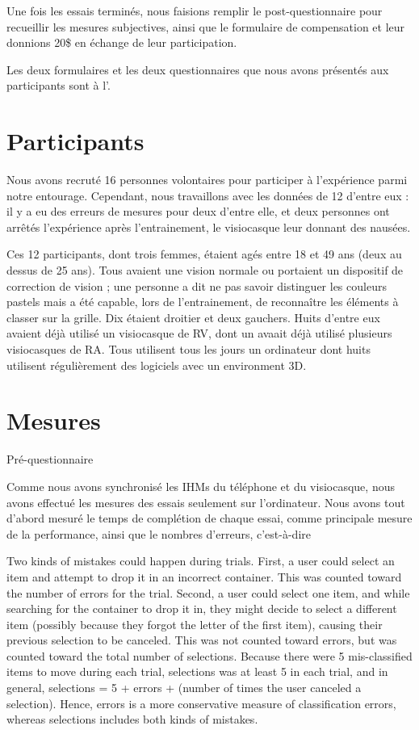 Une fois les essais terminés, nous faisions remplir le post-questionnaire pour recueillir les mesures subjectives, ainsi que le formulaire de compensation et leur donnions 20\$ en échange de leur participation.

Les deux formulaires et les deux questionnaires que nous avons présentés aux participants sont à l'.


\section{Participants}
\label{sec:experiment_participants}

Nous avons recruté 16 personnes volontaires pour participer à l'expérience parmi notre entourage. Cependant, nous travaillons avec les données de 12 d'entre eux : il y a eu des erreurs de mesures pour deux d'entre elle, et deux personnes ont arrêtés l'expérience après l'entrainement, le visiocasque leur donnant des nausées.

Ces 12 participants, dont trois femmes, étaient agés entre 18 et 49 ans (deux au dessus de 25 ans). Tous avaient une vision normale ou portaient un dispositif de correction de vision ; une personne a dit ne pas savoir distinguer  les couleurs pastels mais a été capable, lors de l'entrainement, de reconnaître les éléments à classer sur la grille. Dix étaient droitier et deux gauchers. Huits d'entre eux avaient déjà utilisé un visiocasque de RV, dont un avaait déjà utilisé plusieurs visiocasques de RA. Tous utilisent tous les jours un ordinateur dont huits utilisent régulièrement des logiciels avec un environment 3D.


\section{Mesures}
\label{sec:experiment_measures}

Pré-questionnaire

Comme nous avons synchronisé les IHMs du téléphone et du visiocasque, nous avons effectué les mesures des essais seulement sur l'ordinateur. Nous avons tout d'abord mesuré le temps de complétion de chaque essai, comme principale mesure de la performance, ainsi que le nombres d'erreurs, c'est-à-dire 

Two kinds of mistakes could happen during trials. First, a user could select an item and attempt to drop it in an incorrect container. This was counted toward the number of errors for the trial. Second, a user could select one item, and while searching for the container to drop it in, they might decide to select a different item (possibly because they forgot the letter of the first item), causing their previous selection to be canceled. This was not counted toward errors, but was counted toward the total number of selections. Because there were 5 mis-classified items to move during each trial, selections was at least 5 in each trial, and in general, selections = 5 + errors + (number of times the user canceled a selection). Hence, errors is a more conservative measure of classification errors, whereas selections includes both kinds of mistakes.

